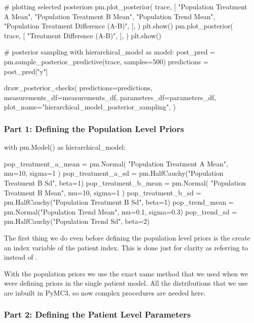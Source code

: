 \documentclass[12pt,a4paper,leqno]{report}
\theoremstyle{plain}
\theoremstyle{definition}
\theoremstyle{remark}
\begin{document}
\begin{pyverbatim}[][fontsize=\footnotesize]
    # plotting selected posteriors
    pm.plot_posterior(
        trace,
        [
            "Population Treatment A Mean",
            "Population Treatment B Mean",
            "Population Trend Mean",
            "Population Treatment Difference (A-B)",
        ],
    )
    plt.show()
    pm.plot_posterior(
        trace,
        [
            "Treatment Difference (A-B)",
        ],
    )
    plt.show()

# posterior sampling
with hierarchical_model as model:
    post_pred = pm.sample_posterior_predictive(trace, samples=500)
    predictions = post_pred["y"]

draw_posterior_checks(
    predictions=predictions,
    measurements_df=measurements_df,
    parameters_df=parameters_df,
    plot_name="hierarchical_model_posterior_sampling",
)
\end{pyverbatim}
\bigskip

\subsubsection*{Part 1: Defining the Population Level Priors}
\bigskip
\begin{pyverbatim}[][fontsize=\footnotesize]
with pm.Model() as hierarchical_model:

    pop_treatment_a_mean = pm.Normal(
        "Population Treatment A Mean", mu=10, sigma=1
    )
    pop_treatment_a_sd = pm.HalfCauchy("Population Treatment B Sd", beta=1)
    pop_treatment_b_mean = pm.Normal(
        "Population Treatment B Mean", mu=10, sigma=1
    )
    pop_treatment_b_sd = pm.HalfCauchy("Population Treatment B Sd", beta=1)
    pop_trend_mean = pm.Normal("Population Trend Mean", mu=0.1, sigma=0.3)
    pop_trend_sd = pm.HalfCauchy("Population Trend Sd", beta=2)

\end{pyverbatim}
\bigskip

The first thing we do even before defining the population level priors is the create an
index variable of the patient index. This is done just for clarity as referring to
 instead of .

With the population priors we use the exact same method that we used when we were
defining priors in the single patient model. All the distributions that we use are
inbuilt in PyMC3, so now complex procedures are needed here.

\subsubsection*{Part 2: Defining the Patient Level Parameters}
\end{document}
